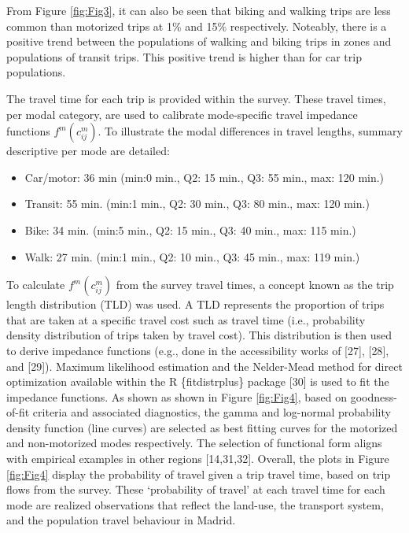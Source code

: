 \documentclass[10pt,letterpaper]{article}
\providecommand{\tightlist}{%
  \setlength{\itemsep}{0pt}\setlength{\parskip}{0pt}}
\begin{document}
From Figure \ref{fig:Fig3}, it can also be seen that biking and walking
trips are less common than motorized trips at 1\% and 15\% respectively.
Noteably, there is a positive trend between the populations of walking
and biking trips in zones and populations of transit trips. This
positive trend is higher than for car trip populations.

The travel time for each trip is provided within the survey. These
travel times, per modal category, are used to calibrate mode-specific
travel impedance functions \(f^m(c_{ij}^m)\). To illustrate the modal
differences in travel lengths, summary descriptive per mode are
detailed:

\begin{itemize}
\tightlist
\item
  Car/motor: 36 min (min:0 min., Q2: 15 min., Q3: 55 min., max: 120
  min.)
\item
  Transit: 55 min. (min:1 min., Q2: 30 min., Q3: 80 min., max: 120 min.)
\item
  Bike: 34 min. (min:5 min., Q2: 15 min., Q3: 40 min., max: 115 min.)
\item
  Walk: 27 min. (min:1 min., Q2: 10 min., Q3: 45 min., max: 119 min.)
\end{itemize}

To calculate \(f^m(c_{ij}^m)\) from the survey travel times, a concept
known as the trip length distribution (TLD) was used. A TLD represents
the proportion of trips that are taken at a specific travel cost such as
travel time (i.e., probability density distribution of trips taken by
travel cost). This distribution is then used to derive impedance
functions (e.g., done in the accessibility works of {[}27{]}, {[}28{]},
and {[}29{]}). Maximum likelihood estimation and the Nelder-Mead method
for direct optimization available within the R \{fitdistrplus\} package
{[}30{]} is used to fit the impedance functions. As shown as shown in
Figure \ref{fig:Fig4}, based on goodness-of-fit criteria and associated
diagnostics, the gamma and log-normal probability density function (line
curves) are selected as best fitting curves for the motorized and
non-motorized modes respectively. The selection of functional form
aligns with empirical examples in other regions {[}14,31,32{]}. Overall,
the plots in Figure \ref{fig:Fig4} display the probability of travel
given a trip travel time, based on trip flows from the survey. These
`probability of travel' at each travel time for each mode are realized
observations that reflect the land-use, the transport system, and the
population travel behaviour in Madrid.
\end{document}
